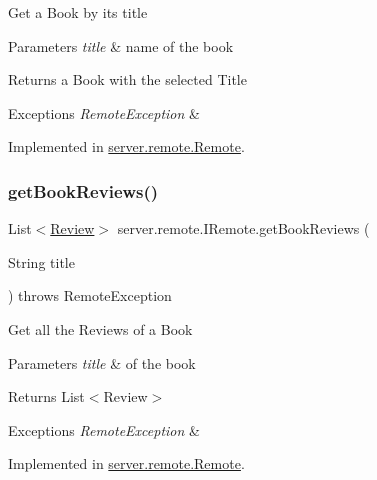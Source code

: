 Get a Book by its title 
\begin{DoxyParams}{Parameters}
{\em title} & name of the book \\
\hline
\end{DoxyParams}
\begin{DoxyReturn}{Returns}
a Book with the selected Title 
\end{DoxyReturn}

\begin{DoxyExceptions}{Exceptions}
{\em Remote\+Exception} & \\
\hline
\end{DoxyExceptions}


Implemented in \hyperlink{classserver_1_1remote_1_1_remote_a560427fc017e15f04e12bd880e6f086e}{server.\+remote.\+Remote}.

\mbox{\label{interfaceserver_1_1remote_1_1_i_remote_a600254593b70d9757190475d3435b390}} 
\subsubsection{\texorpdfstring{get\+Book\+Reviews()}{getBookReviews()}}
{\footnotesize\ttfamily List$<$\hyperlink{classserver_1_1data_1_1_review}{Review}$>$ server.\+remote.\+I\+Remote.\+get\+Book\+Reviews (\begin{DoxyParamCaption}\item[{String}]{title }\end{DoxyParamCaption}) throws Remote\+Exception}

Get all the Reviews of a Book 
\begin{DoxyParams}{Parameters}
{\em title} & of the book \\
\hline
\end{DoxyParams}
\begin{DoxyReturn}{Returns}
List$<$\+Review$>$ 
\end{DoxyReturn}

\begin{DoxyExceptions}{Exceptions}
{\em Remote\+Exception} & \\
\hline
\end{DoxyExceptions}


Implemented in \hyperlink{classserver_1_1remote_1_1_remote_a501e5c5fe847917c9615f0772864a147}{server.\+remote.\+Remote}.

